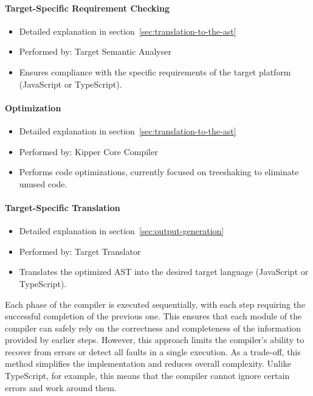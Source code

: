 \paragraph{Target-Specific Requirement Checking}
\begin{itemize}
	\item Detailed explanation in section~\ref{sec:translation-to-the-ast}
	\item Performed by: Target Semantic Analyser
	\item Ensures compliance with the specific requirements of the target platform (JavaScript or TypeScript).
\end{itemize}

\paragraph{Optimization}
\begin{itemize}
	\item Detailed explanation in section~\ref{sec:translation-to-the-ast}
	\item Performed by: Kipper Core Compiler
	\item Performs code optimizations, currently focused on treeshaking to eliminate unused code.
\end{itemize}

\paragraph{Target-Specific Translation}
\begin{itemize}
\item Detailed explanation in section~\ref{sec:output-generation}
\item Performed by: Target Translator
\item Translates the optimized AST into the desired target language (JavaScript or TypeScript).
\end{itemize}

Each phase of the compiler is executed sequentially, with each step requiring the successful completion of the previous one. This ensures that each module of the compiler can safely rely on the correctness and completeness of the information provided by earlier steps. However, this approach limits the compiler's ability to recover from errors or detect all faults in a single execution. As a trade-off, this method simplifies the implementation and reduces overall complexity. Unlike TypeScript, for example, this means that the compiler cannot ignore certain errors and work around them. 

